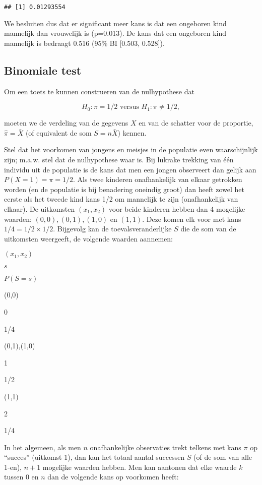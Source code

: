 \documentclass[
  12pt,dutch,coursenotes]{book}
\theoremstyle{definition}
\theoremstyle{definition}
\theoremstyle{definition}
\theoremstyle{remark}
\begin{document}
\begin{verbatim}
## [1] 0.01293554
\end{verbatim}

We besluiten dus dat er significant meer kans is dat een ongeboren kind mannelijk dan vrouwelijk is (p=0.013). De kans dat een ongeboren kind mannelijk is bedraagt 0.516 (95\% BI {[}0.503, 0.528{]}).

\hypertarget{subsec:binom}{%
\subsection{Binomiale test}\label{subsec:binom}}

Om een toets te kunnen construeren van de nulhypothese
dat

\[H_0: \pi=1/2 \text{ versus } H_1: \pi\neq 1/2,\]

moeten we de verdeling van de
gegevens \(X\) en van de schatter voor de proportie, \(\hat \pi = \bar X\) (of equivalent de som \(S=n\bar X\)) kennen.

Stel dat het voorkomen van jongens en meisjes in de populatie even waarschijnlijk zijn; m.a.w. stel dat de nulhypothese waar is. Bij lukrake trekking
van één individu uit de populatie is de kans dat men een jongen observeert dan gelijk aan \(P(X=1) = \pi = 1/2.\)
Als twee kinderen onafhankelijk van elkaar getrokken worden (en de populatie is bij benadering oneindig groot) dan heeft zowel
het eerste als het tweede kind kans 1/2 om mannelijk te zijn
(onafhankelijk van elkaar). De uitkomsten \((x_1, x_2)\) voor beide kinderen
hebben dan 4 mogelijke waarden: \((0,0), (0,1),(1,0)\) en \((1,1).\) Deze komen
elk voor met kans \(1/4 = 1/2 \times 1/2\). Bijgevolg kan de
toevalsveranderlijke \(S\) die de som van de uitkomsten weergeeft, de
volgende waarden aannemen:

\((x_1,x_2)\)

\(s\)

\(P(S=s)\)

(0,0)

0

1/4

(0,1),(1,0)

1

1/2

(1,1)

2

1/4

In het algemeen, als men \(n\) onafhankelijke observaties trekt telkens met kans \(\pi\) op ``succes'' (uitkomst 1), dan kan het totaal aantal successen
\(S\) (of de som van alle 1-en), \(n+1\) mogelijke waarden hebben. Men kan
aantonen dat elke waarde \(k\) tussen 0 en \(n\) dan de volgende kans op
voorkomen heeft:
\end{document}
